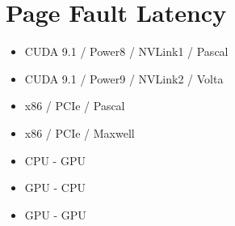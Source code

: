 \section{Page Fault Latency}

\begin{itemize}
    \item CUDA 9.1 / Power8 / NVLink1 / Pascal
    \item CUDA 9.1 / Power9 / NVLink2 / Volta
    \item x86 / PCIe / Pascal
    \item x86 / PCIe / Maxwell
\end{itemize}

\begin{itemize}
    \item CPU - GPU
    \item GPU - CPU
    \item GPU - GPU
\end{itemize}